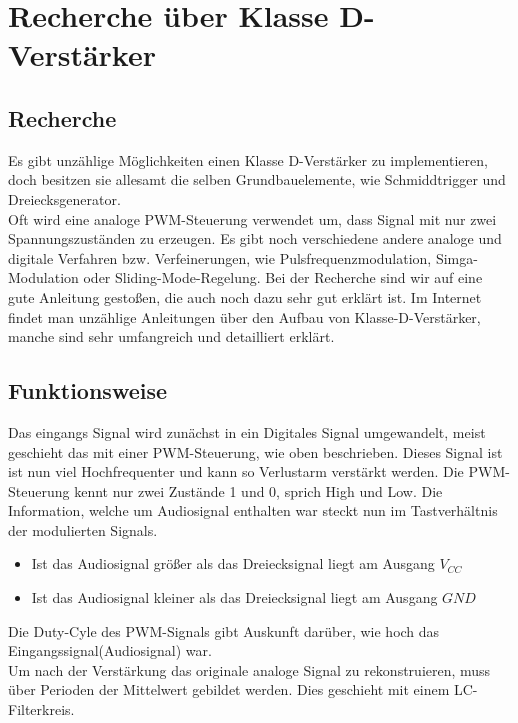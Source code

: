 \documentclass[11pt,a4paper,bibtotoc,oneside]{scrbook}
\begin{document}
\tableofcontents\thispagestyle{empty}
\newpage

\setcounter{page}{1}
\chapter[Recherche über Klasse D-Verstärker]{Recherche über Klasse D-Verstärker}

\section{Recherche}
Es gibt unzählige Möglichkeiten einen Klasse D-Verstärker zu
implementieren, doch besitzen sie allesamt die selben
Grundbauelemente, wie Schmiddtrigger und Dreiecksgenerator.\\ Oft wird eine analoge PWM-Steuerung verwendet um, dass
Signal mit nur zwei Spannungszuständen zu erzeugen. Es gibt noch verschiedene andere analoge und digitale Verfahren
bzw. Verfeinerungen, wie Pulsfrequenzmodulation, Simga-Modulation oder
Sliding-Mode-Regelung.\textcolor{blue}{\cite{digWik}}
Bei der Recherche sind wir auf eine gute Anleitung gestoßen, die auch noch dazu sehr gut erklärt
ist.\textcolor{blue}{\cite{cae}}
Im Internet findet man unzählige Anleitungen über den Aufbau von Klasse-D-Verstärker, manche sind sehr umfangreich und
detailliert erklärt.
\section{Funktionsweise}
Das eingangs Signal wird zunächst in ein Digitales Signal umgewandelt, meist geschieht das mit einer PWM-Steuerung, wie
oben beschrieben. Dieses Signal ist ist nun viel Hochfrequenter und kann so Verlustarm verstärkt werden. Die
PWM-Steuerung kennt nur zwei Zustände 1 und 0, sprich High und Low. Die Information, welche um Audiosignal enthalten
war steckt nun im Tastverhältnis der modulierten Signals.
\begin{itemize}
    \item Ist das Audiosignal größer als das Dreiecksignal liegt am Ausgang $V_{CC}$
    \item Ist das Audiosignal kleiner als das Dreiecksignal liegt am Ausgang $GND$
\end{itemize}
Die Duty-Cyle des PWM-Signals gibt Auskunft darüber, wie hoch das Eingangssignal(Audiosignal) war.\\
Um nach der Verstärkung das originale analoge Signal zu rekonstruieren, muss über Perioden der Mittelwert gebildet
werden. Dies geschieht mit einem LC-Filterkreis.
\end{document}
